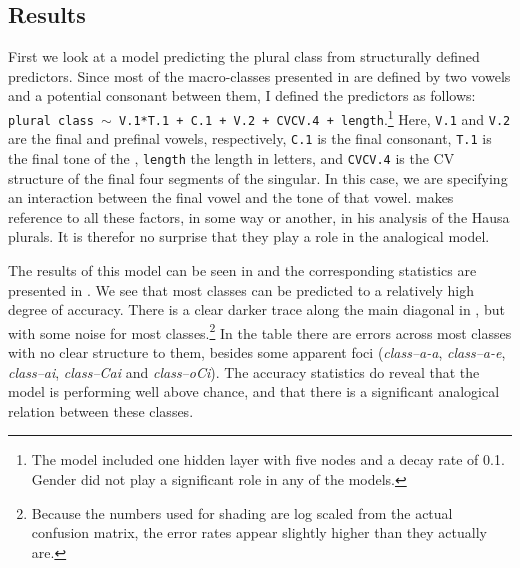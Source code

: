 \subsection{Results}

First we look at a model predicting the plural class from structurally defined predictors. Since most of the macro-classes presented in  are defined by two vowels and a potential consonant between them, I defined the predictors as follows: \texttt{plural class $\sim$ V.1*T.1 + C.1 + V.2 + CVCV.4 + length}.\footnote{The model included one hidden layer with five nodes and a decay rate of 0.1. Gender did not play a significant role in any of the models.} Here, \texttt{V.1} and \texttt{V.2} are the final and prefinal vowels, respectively, \texttt{C.1} is the final consonant, \texttt{T.1} is the final tone of the , \texttt{length} the length in letters, and \texttt{CVCV.4} is the CV structure of the final four segments of the singular. In this case, we are specifying an interaction between the final vowel and the tone of that vowel. \textcite[chapter 56]{Newman.2000} makes reference to all these factors, in some way or another, in his analysis of the Hausa plurals. It is therefor no surprise that they play a role in the analogical model.

The results of this model can be seen in  and the corresponding statistics are presented in . We see that most classes can be predicted to a relatively high degree of accuracy. There is a clear darker trace along the main diagonal in , but with some noise for most classes.\footnote{Because the numbers used for shading are log scaled from the actual confusion matrix, the error rates appear slightly higher than they actually are.} In the table there are errors across most classes with no clear structure to them, besides some apparent foci (\textit{class--a-a}, \textit{class--a-e}, \textit{class--ai}, \textit{class--Cai} and \textit{class--oCi}). The accuracy statistics do reveal that the model is performing well above chance, and that there is a significant analogical relation between these classes.


